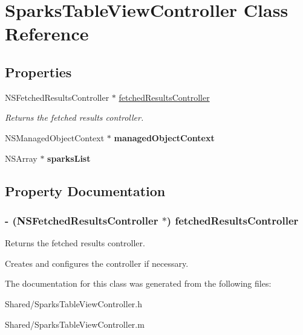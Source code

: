 \hypertarget{interface_sparks_table_view_controller}{
\section{SparksTableViewController Class Reference}
\label{interface_sparks_table_view_controller}
}
\subsection*{Properties}
\begin{DoxyCompactItemize}
\item 
NSFetchedResultsController $\ast$ \hyperlink{interface_sparks_table_view_controller_a6d66880e34229e3bc2da3c13d627d0ac}{fetchedResultsController}
\begin{DoxyCompactList}\small\item\em Returns the fetched results controller. \end{DoxyCompactList}\item 
\hypertarget{interface_sparks_table_view_controller_afae3979b51807757d36ff35a7e3edef7}{
NSManagedObjectContext $\ast$ {\bfseries managedObjectContext}}
\label{interface_sparks_table_view_controller_afae3979b51807757d36ff35a7e3edef7}

\item 
\hypertarget{interface_sparks_table_view_controller_a6b585b9ec3a3770d57194c8dcc50664c}{
NSArray $\ast$ {\bfseries sparksList}}
\label{interface_sparks_table_view_controller_a6b585b9ec3a3770d57194c8dcc50664c}

\end{DoxyCompactItemize}


\subsection{Property Documentation}
\hypertarget{interface_sparks_table_view_controller_a6d66880e34229e3bc2da3c13d627d0ac}{
\subsubsection[{fetchedResultsController}]{\setlength{\rightskip}{0pt plus 5cm}-\/ (NSFetchedResultsController $\ast$) fetchedResultsController}}
\label{interface_sparks_table_view_controller_a6d66880e34229e3bc2da3c13d627d0ac}


Returns the fetched results controller. 

Creates and configures the controller if necessary. 

The documentation for this class was generated from the following files:\begin{DoxyCompactItemize}
\item 
Shared/SparksTableViewController.h\item 
Shared/SparksTableViewController.m\end{DoxyCompactItemize}
